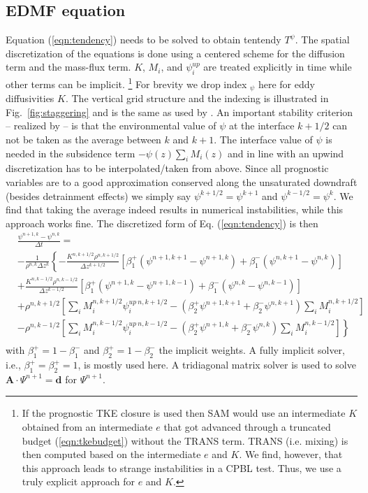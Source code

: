 \documentclass[dvipdfmx,a4paper,10pt]{article}
\begin{document}
\subsection{EDMF equation}

Equation (\ref{eqn:tendency}) needs to be solved to obtain tentendy $T^{\psi}$. The spatial discretization of the equations is done using a centered scheme for the diffusion term and the mass-flux term. $K$, $M_i$, and $\psi^{up}_i$ are treated explicitly in time while other terms can be implicit. \footnote{If the prognostic TKE closure is used then SAM would use an intermediate $K$ obtained from an intermediate $e$ that got advanced through a truncated budget (\ref{eqn:tkebudget}) without the TRANS term. TRANS (i.e. mixing) is then computed based on the intermediate $e$ and $K$. We find, however, that this approach leads to strange instabilities in a CPBL test. Thus, we use a truly explicit approach for $e$ and $K$.} For brevity we drop index $_\psi$ here for eddy diffusivities $K$. The vertical grid structure and the indexing is illustrated in Fig.~\ref{fig:staggering} and is the same as used by \cite{tiedtke89}. An important stability criterion -- realized by \cite{tiedtke89} -- is that the environmental value of $\psi$ at the interface $k+1/2$ can not be taken as the average between $k$ and $k+1$. The interface value of $\psi$ is needed in the subsidence term $- \psi(z) \sum_i M_i(z)$ and in line with an upwind discretization has to be interpolated/taken from above. Since all prognostic variables are to a good approximation conserved along the unsaturated downdraft (besides detrainment effects) we simply say $\psi^{k+1/2}=\psi^{k+1}$ and  $\psi^{k-1/2}=\psi^{k}$. We find that taking the average indeed results in numerical instabilities, while this approach works fine. The discretized form of Eq. (\ref{eqn:tendency}) is then
\begin{align*}
  &\frac{\psi^{n+1,k}- \psi^{n,k} }{\Delta t} =\\
  &-\frac{1}{\rho^{n,k}\Delta z^{k}}\left\{ -\frac{K^{n,k+1/2}\rho^{n,k+1/2} }{\Delta z^{k+1/2}} [\beta_1^+(\psi^{n+1,k+1}-\psi^{n+1,k}) + \beta_1^-(\psi^{n,k+1}-\psi^{n,k})] \right. \\
    & \left.+\frac{K^{n,k-1/2}\rho^{n,k-1/2} }{\Delta z^{k-1/2}} [\beta_1^+(\psi^{n+1,k}-\psi^{n+1,k-1}) + \beta_1^-(\psi^{n,k}-\psi^{n,k-1})] \right.\\
    & \left. +\rho^{n,k+1/2}\left[\sum_i M_i^{n,k+1/2}\psi_i^{up~n,k+1/2} - (\beta_2^+\psi^{n+1,k+1}+\beta_2^-\psi^{n,k+1} )\sum_i M_i^{n,k+1/2} \right]\right.\\
    &\left.-\rho^{n,k-1/2}\left[\sum_i M_i^{n,k-1/2}\psi_i^{up~n,k-1/2} -(\beta_2^+\psi^{n+1,k}+\beta_2^-\psi^{n,k} )\sum_i M_i^{n,k-1/2} \right] \right\}\\
\end{align*}
with $\beta_1^+=1-\beta_1^-$ and $\beta_2^+=1-\beta_2^-$ the implicit weights. A fully implicit solver, i.e., $\beta_1^{+}=\beta_2^{+}=1$, is mostly used here. A tridiagonal matrix solver is used to solve $\mathbf{A}\cdot\Psi^{n+1}=\mathbf{d}$ for $\Psi^{n+1}$. 
\end{document}
